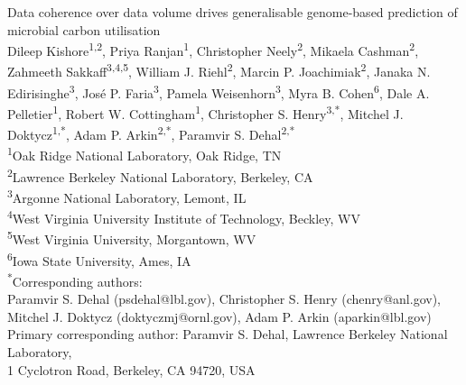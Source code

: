
\begin{titlepage}

  \center


  \vspace*{\fill}
  {\huge Data coherence over data volume drives generalisable genome-based prediction of microbial carbon utilisation}\\[0.4cm]


  \vspace{1.5 cm}
  Dileep Kishore\textsuperscript{1,2},
  Priya Ranjan\textsuperscript{1},
  Christopher Neely\textsuperscript{2},
  Mikaela Cashman\textsuperscript{2},
  Zahmeeth Sakkaff\textsuperscript{3,4,5},
  William J. Riehl\textsuperscript{2},
  Marcin P. Joachimiak\textsuperscript{2},
  Janaka N. Edirisinghe\textsuperscript{3},
  Jos\'{e} P. Faria\textsuperscript{3},
  Pamela Weisenhorn\textsuperscript{3},
  Myra B. Cohen\textsuperscript{6},
  Dale A. Pelletier\textsuperscript{1},
  Robert W. Cottingham\textsuperscript{1},
  Christopher S. Henry\textsuperscript{3,*},
  Mitchel J. Doktycz\textsuperscript{1,*},
  Adam P. Arkin\textsuperscript{2,*},
  Paramvir S. Dehal\textsuperscript{2,*}\\
  \vspace{1cm}
  \textsuperscript{1}Oak Ridge National Laboratory, Oak Ridge, TN\\
  \textsuperscript{2}Lawrence Berkeley National Laboratory, Berkeley, CA\\
  \textsuperscript{3}Argonne National Laboratory, Lemont, IL\\
  \textsuperscript{4}West Virginia University Institute of Technology, Beckley, WV\\
  \textsuperscript{5}West Virginia University, Morgantown, WV\\
  \textsuperscript{6}Iowa State University, Ames, IA\\
  \vspace{1cm}
  \textsuperscript{*}Corresponding authors:\\
  Paramvir S. Dehal (psdehal@lbl.gov),
  Christopher S. Henry (chenry@anl.gov),\\
  Mitchel J. Doktycz (doktyczmj@ornl.gov),
  Adam P. Arkin (aparkin@lbl.gov)\\
  Primary corresponding author: Paramvir S. Dehal, Lawrence Berkeley National Laboratory,\\
  1 Cyclotron Road, Berkeley, CA 94720, USA\\


\end{titlepage}
